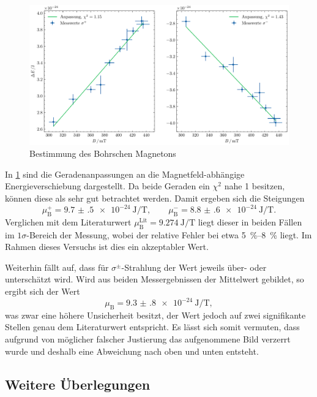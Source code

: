 

\begin{figure}[htb]
    \centering
    \includegraphics[width=0.9\linewidth]{../figs/magneton}
    \caption{Bestimmung des Bohrschen Magnetons}
    \label{fig:bohr_magneton}
\end{figure}

In \cref{fig:bohr_magneton} sind die Geradenanpassungen an die Magnetfeld-abhängige 
Energieverschiebung dargestellt. Da beide Geraden ein $\chi^2$ nahe 1 
besitzen, können diese als sehr gut betrachtet werden. Damit ergeben sich die Steigungen 
\begin{equation}
    \mu_\mathrm B^+ = \SI{9.7(5)e-24}{\joule\per\tesla}, 
    \qquad \mu_\mathrm B^- = \SI{8.8(6)e-24}{\joule\per\tesla}
    \label{eq:magneton_exp}.
\end{equation}
Verglichen mit dem Literaturwert $\mu_\mathrm B^\mathrm{Lit} = \SI{9.274}{\joule\per\tesla}$
liegt dieser in beiden Fällen im $1\sigma$-Bereich der Messung, wobei der relative 
Fehler bei etwa \qtyrange{5}{8}{\percent} liegt. Im Rahmen dieses Versuchs 
ist dies ein akzeptabler Wert. 

Weiterhin fällt auf, dass für $\sigma^\pm$-Strahlung der Wert jeweils über- oder unterschätzt 
wird. Wird aus beiden Messergebnissen der Mittelwert gebildet, so ergibt sich der 
Wert 
\begin{equation*}
    \mu_\mathrm B = \SI{9.3(8)e-24}{\joule\per\tesla},
\end{equation*}
was zwar eine höhere Unsicherheit besitzt, der Wert jedoch auf zwei signifikante Stellen 
genau dem Literaturwert entspricht. Es lässt sich somit vermuten, dass aufgrund 
von möglicher falscher Justierung das aufgenommene Bild verzerrt wurde und deshalb 
eine Abweichung nach oben und unten entsteht.

\subsection{Weitere Überlegungen}
